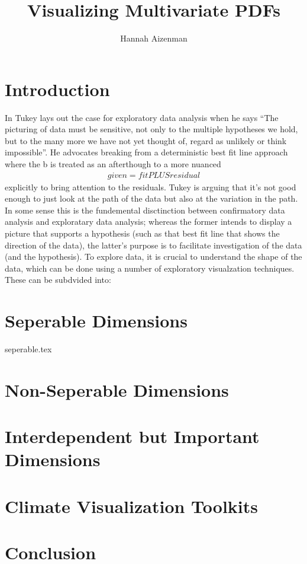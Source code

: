\documentclass[letterpaper,onecolumn,titlepage]{Ythesis}
\title{Visualizing Multivariate PDFs}
\author{Hannah Aizenman}
\begin{document}
\makefrontmatter

\section{Introduction}
In \cite{tukey1975m} Tukey lays out the case for exploratory data analysis when
he says ``The picturing of data must be sensitive, not only to the multiple hypotheses
we hold, but to the many more we have not yet thought of, regard as unlikely or
think impossible''. He advocates breaking from a deterministic 
best fit line approach where the b is treated as an afterthough to a more
nuanced
\begin{align*}
  given = fit PLUS residual
\end{align*}
explicitly to bring attention to the residuals. Tukey is arguing that it's not
good enough to just look at the path of the data but also at the variation in
the path. In some sense this is the fundemental disctinction between
confirmatory data analysis and exploratary data analysis; whereas the former
intends to display a picture that supports a hypothesis (such as that best fit
line that shows the direction of the data), the latter's purpose is to
facilitate investigation of the data (and the hypothesis). To explore data, it
is crucial to understand the shape of the data, which can be done using a
number of exploratory visualzation techniques. These can be subdvided into:



\section{Seperable Dimensions}
{seperable.tex}
\section{Non-Seperable Dimensions}
\section{Interdependent but Important Dimensions}
\section{Climate Visualization Toolkits}

\section{Conclusion}
\label{sec:conclusion}


\pagebreak


\end{document}
